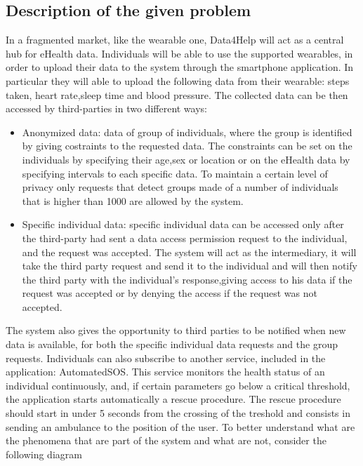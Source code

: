 \subsection{Description of the given problem}
In a fragmented market, like the wearable one, Data4Help will act as a central hub for eHealth data.
Individuals will be able to use the supported wearables, in order to upload their data to the system through the smartphone application. In particular they will able to upload the following data from their wearable: steps taken, heart rate,sleep time and blood pressure.
\givespace
The collected data can be then accessed by third-parties in two different ways:
\begin{itemize}
\item Anonymized data: data of group of individuals, where the group is identified by giving costraints to the requested data. The constraints can be set on the individuals by specifying their age,sex or location or on the eHealth data by specifying intervals to each specific data. To maintain a certain level of privacy only requests that detect groups made of a number of individuals that is higher than 1000 are allowed by the system.
\item Specific individual data: specific individual data can be accessed only after the third-party had sent a data access permission request to the individual, and the request was accepted. The system will act as the intermediary, it will take the third party request and send it to the individual and will then notify the third party with the individual's response,giving access to his data if the request was accepted or by denying the access if the request was not accepted.
\end{itemize}
The system also gives the opportunity to third parties to be notified when new data is available, for both the specific individual data requests and the group requests.
\givespace
Individuals can also subscribe to another service, included in the application: AutomatedSOS. This service monitors the health status of an individual continuously, and, if certain parameters go below a critical threshold, the application starts automatically a rescue procedure. The rescue procedure should start in under 5 seconds from the crossing of the treshold and consists in sending an ambulance to the position of the user.
\givespace
To better understand what are the phenomena that are part of the system and what are not, consider the following diagram
